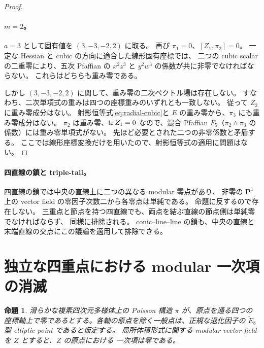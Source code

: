 \documentclass[11pt,a4paper]{ltjsarticle}
\newcommand{\PP}{\mathbf P}\renewcommand{\AA}{\mathbf A}
\newtheorem{proposition}[theorem]{命題}
\theoremstyle{remark}\newtheorem{remark}[theorem]{注意}
\begin{document}
\begin{proof}
\paragraph{$m=2$。}
$a=3$ として固有値を $(3,-3,-2,2)$ に取る。
再び $\pi_1=0$、$[Z_1,\pi_2]=0$。
一定な Hessian と cubic の方向に適合した線形固有座標では、
二つの cubic scalar の二重零により、五次 Pfaffian の
$x^2z^3$ と $y^2w^3$ の係数が共に非零でなければならない。
これらはどちらも重み零である。

しかし $(3,-3,-2,2)$ に関して、重み零の二次ベクトル場は存在しない。
すなわち、二次単項式の重みは四つの座標重みのいずれとも一致しない。
従って $Z_2$ に重み零成分はない。
射影恒等式\eqref{eq:radial-cubic}と $E$ の重み零から、$\pi_3$ にも重み零成分はない。
$\pi_2$ は重み零、$\operatorname{tr} Z_1=0$ なので、混合 Pfaffian
$F_5$（$\pi_2\wedge\pi_3$ の係数）には重み零単項式がない。
先ほど必要とされた二つの非零係数と矛盾する。
ここでは線形座標変換だけを用いたので、射影恒等式の適用に問題はない。
\end{proof}

\paragraph{四直線の鎖と triple-tail。}
四直線の鎖では中央の直線上に二つの異なる modular 零点があり、
非零の $\PP^1$ 上の vector field の零因子次数二から各零点は単純である。
命題に反するので存在しない。
三重点と節点を持つ四直線でも、両点を結ぶ直線の節点側は単純零でなければならず、
同様に排除される。
conic--line--line の鎖も、中央の直線と末端直線の交点にこの議論を適用して排除できる。


\section{独立な四重点における modular 一次項の消滅}

\begin{proposition}
滑らかな複素四次元多様体上の Poisson 構造 $\pi$ が、原点を通る四つの
座標軸上で零であるとする。各軸の原点を除く一般点は、正規な退化因子の
$\widetilde E_8$ 型 elliptic point であると仮定する。
局所体積形式に関する modular vector field を $Z$ とすると、$Z$ の原点における
一次項は零である。
\end{proposition}
\end{document}
